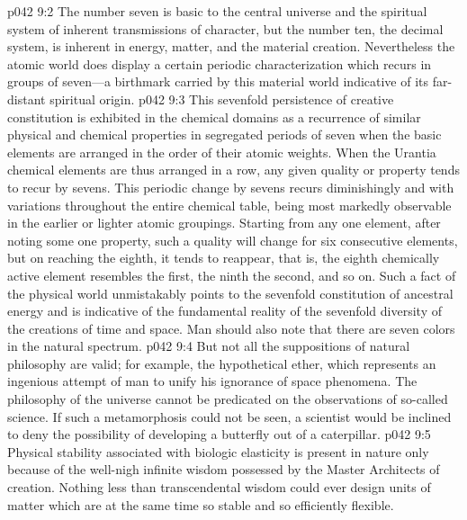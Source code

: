 \vs p042 9:2 The number seven is basic to the central universe and the spiritual system of inherent transmissions of character, but the number ten, the decimal system, is inherent in energy, matter, and the material creation. Nevertheless the atomic world does display a certain periodic characterization which recurs in groups of seven---a birthmark carried by this material world indicative of its far\hyp{}distant spiritual origin.
\vs p042 9:3 This sevenfold persistence of creative constitution is exhibited in the chemical domains as a recurrence of similar physical and chemical properties in segregated periods of seven when the basic elements are arranged in the order of their atomic weights. When the Urantia chemical elements are thus arranged in a row, any given quality or property tends to recur by sevens. This periodic change by sevens recurs diminishingly and with variations throughout the entire chemical table, being most markedly observable in the earlier or lighter atomic groupings. Starting from any one element, after noting some one property, such a quality will change for six consecutive elements, but on reaching the eighth, it tends to reappear, that is, the eighth chemically active element resembles the first, the ninth the second, and so on. Such a fact of the physical world unmistakably points to the sevenfold constitution of ancestral energy and is indicative of the fundamental reality of the sevenfold diversity of the creations of time and space. Man should also note that there are seven colors in the natural spectrum.
\vs p042 9:4 But not all the suppositions of natural philosophy are valid; for example, the hypothetical ether, which represents an ingenious attempt of man to unify his ignorance of space phenomena. The philosophy of the universe cannot be predicated on the observations of so\hyp{}called science. If such a metamorphosis could not be seen, a scientist would be inclined to deny the possibility of developing a butterfly out of a caterpillar.
\vs p042 9:5 Physical stability associated with biologic elasticity is present in nature only because of the well\hyp{}nigh infinite wisdom possessed by the Master Architects of creation. Nothing less than transcendental wisdom could ever design units of matter which are at the same time so stable and so efficiently flexible.
